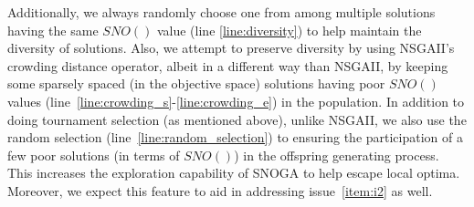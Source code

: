 Additionally, we always randomly choose one from among multiple solutions having the same $SNO()$ value (line \ref{line:diversity}) to help maintain the diversity of solutions. Also, we attempt to preserve diversity by using NSGAII's crowding distance operator, albeit in a different way than NSGAII, by keeping some sparsely spaced (in the objective space) solutions having poor $SNO()$ values (line~\ref{line:crowding_s}-\ref{line:crowding_e}) in the population. In addition to doing tournament selection (as mentioned above), unlike NSGAII, we also use the random selection (line~\ref{line:random_selection}) to ensuring the participation of a few poor solutions (in terms of $SNO()$) in the offspring generating process. This increases the exploration capability of SNOGA to help escape local optima. Moreover, we expect this feature to aid in addressing issue~\ref{item:i2} as well.




